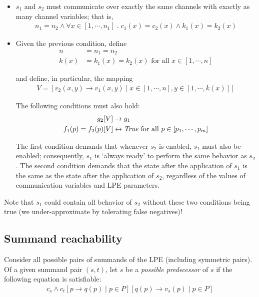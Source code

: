 \begin{itemize}
\item $s_1$ and $s_2$ must communicate over exactly the same channels with exactly as many channel variables; that is,
\begin{align*}
n_1 = n_2 \land \forall x \in [1, \cdots{}, n_1] \;.\; c_1(x) = c_2(x) \land k_1(x) = k_2(x)
\end{align*}

\item Given the previous condition, define
\begin{align*}
n &= n_1 = n_2 \\
k(x) &= k_1(x) = k_2(x) \text{ for all } x \in [1, \cdots{}, n]
\end{align*}

and define, in particular, the mapping
\begin{align*}
V = [v_2(x,y) \rightarrow v_1(x,y) \;|\; x \in [1, \cdots{}, n], y \in [1, \cdots{}, k(x)]]
\end{align*}

The following conditions must also hold:
\begin{align*}
g_2[V] &\rightarrow g_1 \\
f_1(p) = f_2(p)[V] &\leftrightarrow \text{\textit{True}} \text{ for all } p \in [p_1, \cdots{}, p_m]
\end{align*}

The first condition demands that whenever $s_2$ is enabled, $s_1$ must also be enabled; consequently, $s_1$ is `always ready' to perform the same behavior as $s_2$.
The second condition demands that the state after the application of $s_1$ is the same as the state after the application of $s_2$, regardless of the values of communication variables and LPE parameters.
\end{itemize}

Note that $s_1$ could contain all behavior of $s_2$ without these two conditions being true (we under-approximate by tolerating false negatives)!

\subsection{Summand reachability}

Consider all possible pairs of summands of the LPE (including symmetric pairs).
Of a given summand pair $(s, t)$, let $s$ be a \emph{possible predecessor} of $s$ if the following equation is satisfiable:
\begin{align*}
c_s \land {c_t}[p \rightarrow q(p) \;|\; p \in P][q(p) \rightarrow v_s(p) \;|\; p \in P]
\end{align*}

